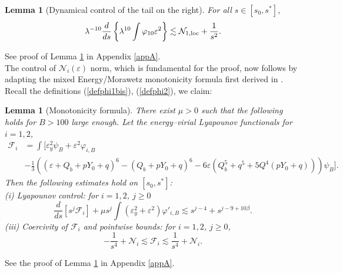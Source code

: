 \documentclass[11pt,a4paper,reqno]{amsart}
\newtheorem{lemma}[theorem]{Lemma}
\theoremstyle{remark}
\numberwithin{equation}{section}
\newcommand{\be}{\begin{equation}}
\newcommand{\ee}{\end{equation}}
\def\fref#1{{\rm (\ref{#1})}}
\def\e{\varepsilon}
\def\fref#1{{\rm (\ref{#1})}}
\def\l{\lambda}
\def\cal{\mathcal}
\def\Yz{Y_0}
\begin{document}
 \begin{lemma}[Dynamical control of the tail on the right]
\label{lemmatail}
For all $s\in [s_0,s^*]$,\be
\label{keyestimate}
 {\l^{-10}}\frac{d}{ds}\left\{\l^{10}\int\varphi_{10}\e^2\right\}\lesssim \mathcal N_{1,\rm loc}+\frac 1{s^2}.
\ee
\end{lemma}
See proof of Lemma \ref{lemmatail} in Appendix \ref{appA}.
\\
 
The  control of   $\mathcal N_i(\e)$ norm, which is fundamental for the proof, now follows by adapting the mixed Energy/Morawetz monotonicity formula first derived in \cite{MMR1}. Recall the definitions \fref{defphi1bis}, \fref{defphi2}, we claim:

\begin{lemma}[Monotonicity formula]
\label{propasymtp}
There exist $\mu>0$ such that the following holds for $B>100$ large enough.   Let   the   energy--virial Lyapounov functionals for $i=1,2$,  
\begin{align}
  {\cal F}_{i} & =  \int \Big[\varepsilon_y^2\psi_B + \varepsilon^2 \varphi_{i,B}  \label{feps}\\ &- \frac  13 \left((\varepsilon {+} Q_b{+}p\Yz{+}q)^6  -  (Q_b{+}p\Yz{+}q)^6   - 6 \varepsilon \left(Q_b^5{+}q^5{+}5Q^4(p\Yz{+}q)\right)\right)\psi_B\Big] .\nonumber
\end{align}
Then   the following estimates hold on $[s_0, s^*]$:\\
{\em (i)  Lyapounov control}: for $i=1,2$, $j\geq 0$
\be
\label{lyapounovconrolbis}
\frac{d}{ds}\left[ s^j {\mathcal F_{i}} \right]+      {\mu} s^j \int   \left(\varepsilon_y^2+\e^2\right)   \varphi'_{i,B}  \lesssim s^{j-4} +s^{j-9+10 \beta} .
\ee
{\em (iii) Coercivity of $\mathcal F_{i}$ and pointwise bounds}: for $i=1,2$, $j\geq 0$,
\begin{equation}
\label{lowerbound}
-\frac 1{s^4} + \mathcal N_i \lesssim \mathcal F_{i}\lesssim \frac 1{s^4} + \mathcal N_i .\end{equation}
\end{lemma}
See the proof of Lemma \ref{propasymtp} in Appendix \ref{appA}.
\\
\end{document}
